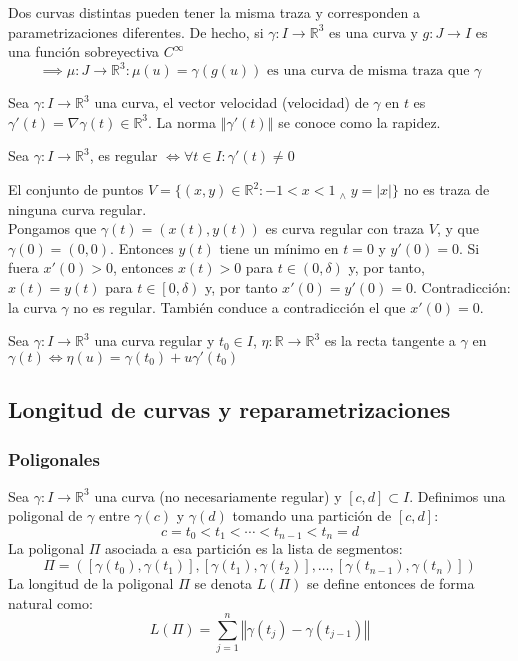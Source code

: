 \documentclass[12pt]{article}
\theoremstyle{plain}
\newcommand{\R}{\mathbb{R}}
\newcommand{\norm}[1]{\left\Vert#1\right\Vert}
\newcommand{\appl}[3]{#1 \colon #2 \longrightarrow #3}
\newcommand{\we}{\; _{\wedge} \;}
\newcommand{\tex}[1]{\text{#1}}
\renewcommand{\norm}[1]{\left\Vert#1\right\Vert}
\begin{document}
\begin{obs}
    Dos curvas distintas pueden tener la misma traza y corresponden a parametrizaciones diferentes. De hecho, si $\appl{\gamma}{I}{\R^3}$ es una curva y $\appl{g}{J}{I}$ es una función sobreyectiva $C^{\infty}$
    \[\implies \appl{\mu}{J}{\R^3} : \mu(u)=\gamma\left(g(u)\right)\tex{ es una curva de misma traza que } \gamma\]
\end{obs}
\begin{defn}
    Sea $\appl{\gamma}{I}{\R^3}$ una curva, el vector velocidad (velocidad) de $\gamma$ en $t$ es $\gamma'(t)=\nabla\gamma(t)\in \R^3$. La norma $\norm{\gamma'(t)}$ se conoce como la rapidez.
\end{defn}
\begin{defn}
    Sea $\appl{\gamma}{I}{\R^3}$, es regular $\iff \forall t \in I : \gamma'(t)\ne 0$
\end{defn}
\begin{ejem}
    El conjunto de puntos $V=\{(x, y)\in \R^2:-1<x<1\we y=|x|\}$ no es traza de ninguna curva regular.\\
    \indent Pongamos que $\gamma(t)=(x(t), y(t))$ es curva regular con traza $V$, y que $\gamma(0)=(0,0)$. Entonces $y(t)$ tiene un mínimo en $t = 0$ y $y'(0) = 0$. Si fuera $x'(0) > 0$, entonces $x(t) > 0$ para $t \in (0, \delta)$ y, por tanto, $x(t) =y(t)$ para $t \in \left[0, \delta\right)$ y, por tanto $x'(0) = y'(0) = 0$. Contradicción: la curva $\gamma$ no es regular. También conduce a contradicción el que $x'(0) = 0$.
\end{ejem}
\begin{defn}
    Sea $\appl{\gamma}{I}{\R^3}$ una curva regular y $t_0\in I$, $\appl{\eta}{\R}{\R^3}$ es la recta tangente a $\gamma$ en $\gamma(t) \iff \eta(u)=\gamma(t_0)+u\gamma'(t_0)$
\end{defn}

\subsection{Longitud de curvas y reparametrizaciones}
\subsubsection{Poligonales}
Sea $\appl{\gamma}{I}{\R^3}$ una curva (no necesariamente regular) y $\left[c, d\right] \subset I$. Definimos una poligonal de $\gamma$ entre $\gamma(c)$ y $\gamma(d)$ tomando una partición de $\left[c, d\right]$:
\[c=t_0<t_1<\cdots<t_{n-1}<t_n=d\]
La poligonal $\Pi$ asociada a esa partición es la lista de segmentos:
\[\Pi=\left(\left[\gamma(t_0), \gamma(t_1)\right], \left[\gamma(t_1), \gamma(t_2)\right], \dots, \left[\gamma(t_{n-1}), \gamma(t_n)\right]\right)\]
La longitud de la poligonal $\Pi$ se denota $L(\Pi)$ se define entonces de forma natural como:
\[L(\Pi)=\sum_{j=1}^n \norm{\gamma(t_j)-\gamma(t_{j-1})}\]
\end{document}
